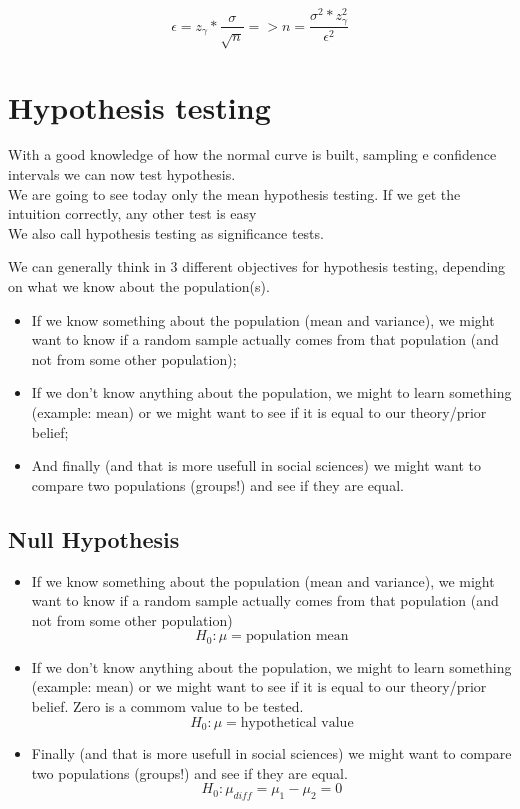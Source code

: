 \documentclass[11pt]{article}
\begin{document}
	\[\epsilon=z_\gamma*\frac{\sigma}{\sqrt{n}} => n=\frac{\sigma^2*z_\gamma^2}{\epsilon^2}\]	

\section{Hypothesis testing}


	With a good knowledge of how the normal curve is built, sampling e confidence intervals we can now test hypothesis.\\
	
	We are going to see today only the mean hypothesis testing. If we get the intuition correctly, any other test is easy\\
	
	We also call hypothesis testing as significance tests.

	We can generally think in 3 different objectives for hypothesis testing, depending on what we know about the population(s).
	\begin{itemize}
		\item If we know something about the population (mean and variance), we might want to know if a random sample actually comes from that population (and not from some other population);
		\item If we don't know anything about the population, we might to learn something (example: mean) or we might want to see if it is equal to our theory/prior belief;
		\item And finally (and that is more usefull in social sciences) we might want to compare two populations (groups!) and see if they are equal.
	\end{itemize}

	\subsection*{Null Hypothesis}

	\begin{itemize}
		\item If we know something about the population (mean and variance), we might want to know if a random sample actually comes from that population (and not from some other population)
		\[H_0: \mu = \text{population mean}\]
		\item If we don't know anything about the population, we might to learn something (example: mean) or we might want to see if it is equal to our theory/prior belief. Zero is a commom value to be tested.
		\[H_0: \mu = \text{hypothetical value} \]
		\item Finally (and that is more usefull in social sciences) we might want to compare two populations (groups!) and see if they are equal.
		\[H_0: \mu_{diff} = \mu_1 - \mu_2 = 0\]
	\end{itemize}
\end{document}
